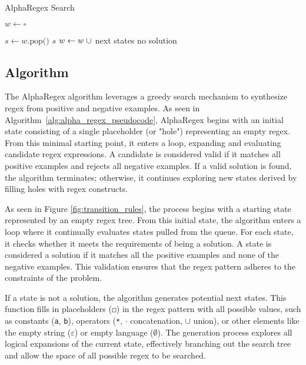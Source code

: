 \begin{algorithm}
    \caption{AlphaRegex Search}
    \label{alg:alpha_regex_pseudocode}
    \begin{algorithmic}[1]
    \State $w \gets \square$
    
    \State $s \gets w.\text{pop()}$
            \State \Return $s$
        \EndIf
        \State $w \gets w\hspace{0.3em}\cup$ next states
    \EndWhile
    \State \Return no solution
    \end{algorithmic}
    \end{algorithm}


\subsection{Algorithm}

\indent \indent The AlphaRegex algorithm leverages a greedy search mechanism to synthesize regex from positive and negative examples. As seen in Algorithm~\ref{alg:alpha_regex_pseudocode}, AlphaRegex begins with an initial state consisting of a single placeholder (or "hole") representing an empty regex. From this minimal starting point, it enters a loop, expanding and evaluating candidate regex expressions. A candidate is considered valid if it matches all positive examples and rejects all negative examples. If a valid solution is found, the algorithm terminates; otherwise, it continues exploring new states derived by filling holes with regex constructs.

\indent\indent As seen in Figure \ref{fig:transition_rules}, the process begins with a starting state represented by an empty regex tree. From this initial state, the algorithm enters a loop where it continually evaluates states pulled from the queue. For each state, it checks whether it meets the requirements of being a solution. A state is considered a solution if it matches all the positive examples and none of the negative examples. This validation ensures that the regex pattern adheres to the constraints of the problem.

\indent\indent If a state is not a solution, the algorithm generates potential next states. This function fills in placeholders ($\Hsquare$) in the regex pattern with all possible values, such as constants (\texttt{a}, \texttt{b}), operators (\texttt{*}, \( \cdot \) concatenation, \( \cup \) union), or other elements like the empty string (\( \varepsilon \)) or empty language (\( \emptyset \)). The generation process explores all logical expansions of the current state, effectively branching out the search tree and allow the space of all possible regex to be searched. 

